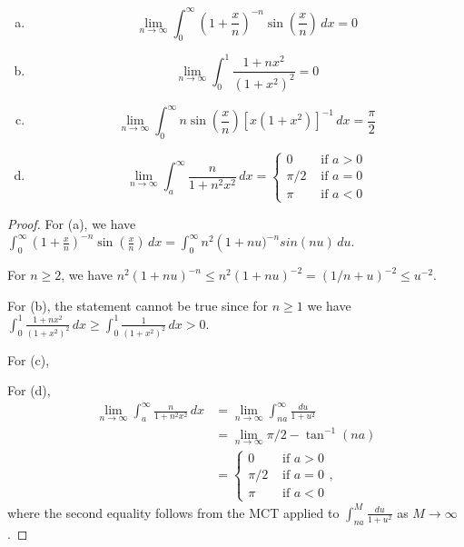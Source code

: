 \documentclass{article}
\begin{document}
\begin{enumerate}[(a)]
\item $$\lim_{n\to \infty} \int_0^\infty \left( 1 + \frac x n \right)^{-n} \sin \left(\frac x n \right) \, dx = 0$$
\item $$\lim_{n \to \infty} \int_0^1 \frac{1 + n x^2} {(1 + x^2)^2} = 0$$
\item $$\lim_{n \to \infty} \int_0^\infty n \sin \left( \frac x n \right) [x(1+x^2)]^{-1} \, dx = \frac \pi 2$$
\item $$\lim_{n \to \infty} \int_a^\infty \frac n {1 + n^2 x^2} \, dx= \left\{ 
\begin{array}{ll}
   0 & \text{ if } a > 0
\\ \pi/2 & \text{ if } a = 0
\\ \pi  & \text{ if } a < 0
\end{array} \right.
$$
\end{enumerate}

\begin{proof}
For (a), we have  $\int_0^\infty \left( 1 + \frac x n \right)^{-n} \sin \left(\frac x n \right) \, dx  = \int_0^\infty n^2 \left( 1 + n u)^{-n} sin(nu) \, du$.

For $n \ge 2$, we have $n^2 (1 + nu)^{-n} \le n^2 (1 + nu)^{-2} = (1/n + u)^{-2}  \le u^{-2}$.







For (b), the statement cannot be true since for $n \ge 1$ we have $\int_0^1 \frac{1 + n x^2} {(1 + x^2)^2} \, dx \ge \int_0^1 \frac 1 {(1+x^2)^2} \,dx > 0$.

For (c),


For (d),
\begin{align*}
\lim_{n \to \infty} \int_a^\infty \frac n {1 + n^2 x^2} \, dx  & = \lim_{n \to \infty} \int_{na}^\infty \frac {du} {1 + u^2} 
\\ & = \lim_{n \to \infty} \pi/2 - \tan^{-1}(na)
\\ & = \left\{ 
\begin{array}{ll}
   0 & \text{ if } a > 0
\\ \pi/2 & \text{ if } a = 0
\\ \pi  & \text{ if } a < 0
\end{array} \right.,
\end{align*}
where the second equality follows from the MCT applied to $\int_{na}^M \frac {du} {1+u^2}$ as $M \to \infty$.



\end{proof}
\end{document}
